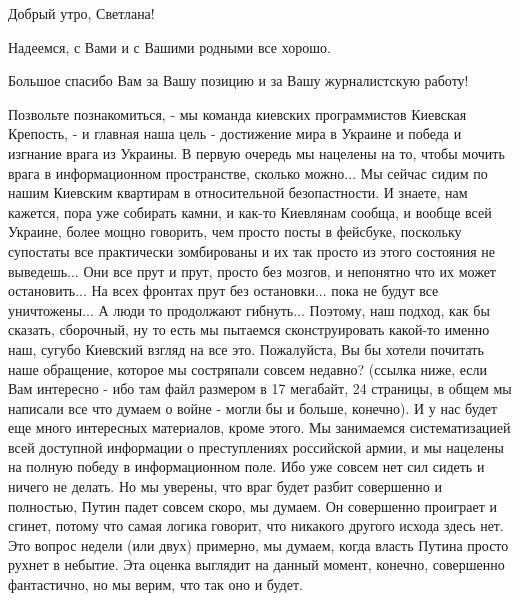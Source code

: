  
 
 
 
 

Добрый утро, Светлана!

Надеемся, с Вами и с Вашими родными все хорошо.

Большое спасибо Вам за Вашу позицию и за Вашу журналистскую работу!

Позвольте познакомиться, - мы команда киевских программистов Киевская Крепость,
- и главная наша цель - достижение мира в Украине и победа и изгнание врага из
Украины. В первую очередь мы нацелены на то, чтобы мочить врага в
информационном пространстве, сколько можно... Мы сейчас сидим по нашим Киевским
квартирам в относительной безопастности.  И знаете, нам кажется, пора уже
собирать камни, и как-то Киевлянам сообща, и вообще всей Украине, более мощно
говорить, чем просто посты в фейсбуке, поскольку супостаты все практически
зомбированы и их так просто из этого состояния не выведешь... Они все прут и
прут, просто без мозгов, и непонятно что их может остановить... На всех фронтах
прут без остановки... пока не будут все уничтожены...  А люди то продолжают
гибнуть...  Поэтому, наш подход, как бы сказать, сборочный, ну то есть мы
пытаемся сконструировать какой-то именно наш, сугубо Киевский взгляд на все
это.  Пожалуйста, Вы бы хотели почитать наше обращение, которое мы состряпали
совсем недавно? (ссылка ниже, если Вам интересно - ибо там файл размером в 17
мегабайт, 24 страницы, в общем мы написали все что думаем о войне - могли бы и
больше, конечно). И у нас будет еще много интересных материалов, кроме этого.
Мы занимаемся систематизацией всей доступной информации о преступлениях
российской армии, и мы нацелены на полную победу в информационном поле. Ибо уже
совсем нет сил сидеть и ничего не делать. Но мы уверены, что враг будет разбит
совершенно и полностью, Путин падет совсем скоро, мы думаем.  Он совершенно
проиграет и сгинет, потому что самая логика говорит, что никакого другого
исхода здесь нет. Это вопрос недели (или двух) примерно, мы думаем, когда
власть Путина просто рухнет в небытие.  Эта оценка выглядит на данный момент,
конечно, совершенно фантастично, но мы верим, что так оно и будет.

